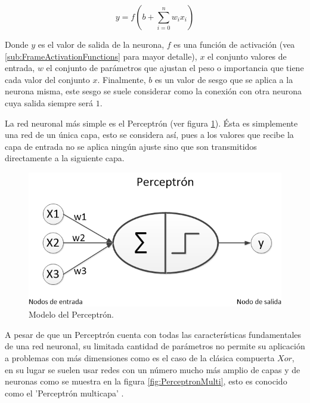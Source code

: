             \begin{equation}
                \label{EQ:BasicNeuron}
                y = f(b + \sum_{i=0}^n w_i x_i)
            \end{equation}
            
            Donde $y$ es el valor de salida de la neurona, $f$ es una función de activación  (vea \ref{sub:FrameActivationFunctions} para mayor detalle), $x$ el conjunto valores de entrada, $w$ el conjunto de parámetros que ajustan el peso o importancia que tiene cada valor del conjunto $x$. Finalmente, $b$ es un valor de sesgo que se aplica a la neurona misma, este sesgo se suele considerar como la conexión con otra neurona cuya salida siempre será $1$.
            
            La red neuronal más simple es el Perceptrón  (ver figura \ref{fig:Perceptron}). Ésta es simplemente una red de un única capa, esto se considera así, pues a los valores que recibe la capa de entrada no se aplica ningún ajuste sino que son transmitidos directamente a la siguiente capa.
            
            \begin{figure}[ht!]
            	\centering
            	\includegraphics[width=0.6\linewidth]{imgs/02-Referential/02-Perceptron.png}
            	\caption[Modelo del Perceptrón]{Modelo del Perceptrón.}
        	    \label{fig:Perceptron}
            \end{figure}%
            
             A pesar de que un Perceptrón  cuenta con todas las características fundamentales de una red neuronal, su limitada cantidad de parámetros no permite su aplicación a problemas con más dimensiones como es el caso de la clásica compuerta $Xor$, en su lugar se suelen usar redes con un número mucho más amplio de capas y de neuronas como se muestra en la figura \ref{fig:PerceptronMulti}, esto es conocido como el 'Perceptrón multicapa' . 
            
